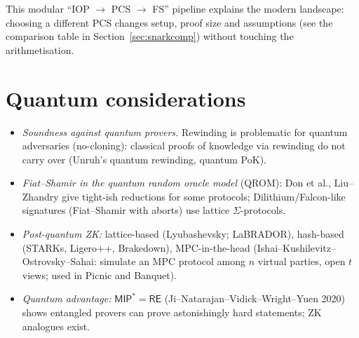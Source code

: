 \documentclass[11pt,a4paper]{report}
\theoremstyle{plain}
\theoremstyle{definition}
\theoremstyle{remark}
\begin{document}
\begin{center}
\end{center}
This modular ``IOP $\to$ PCS $\to$ FS'' pipeline explains the modern landscape: choosing a different PCS changes setup, proof size and assumptions (see the comparison table in Section~\ref{sec:snarkcomp}) without touching the arithmetisation.

\section{Quantum considerations}
\begin{itemize}
\item \emph{Soundness against quantum provers.} Rewinding is problematic for quantum adversaries (no-cloning): classical proofs of knowledge via rewinding do not carry over (Unruh's quantum rewinding, quantum PoK).
\item \emph{Fiat--Shamir in the quantum random oracle model} (QROM): Don et al., Liu--Zhandry give tight-ish reductions for some protocols; Dilithium/Falcon-like signatures (Fiat--Shamir with aborts) use lattice $\Sigma$-protocols.
\item \emph{Post-quantum ZK:} lattice-based (Lyubashevsky; LaBRADOR), hash-based (STARKs, Ligero++, Brakedown), MPC-in-the-head (Ishai--Kushilevitz--Ostrovsky--Sahai: simulate an MPC protocol among $n$ virtual parties, open $t$ views; used in Picnic and Banquet).
\item \emph{Quantum advantage:} $\mathsf{MIP}^*=\mathsf{RE}$ (Ji--Natarajan--Vidick--Wright--Yuen 2020) shows entangled provers can prove astonishingly hard statements; ZK analogues exist.
\end{itemize}
\end{document}
